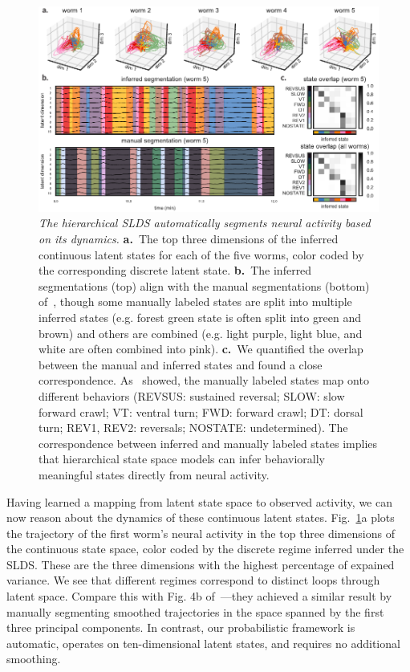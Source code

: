 \documentclass[11pt]{article}
\begin{document}
\begin{figure}[t!]
\centering
\includegraphics[width=6in]{figures/v3/figure4} 
\caption{ \textit{The hierarchical SLDS automatically segments neural
    activity based on its dynamics.}  \textbf{a.}~The top three
  dimensions of the inferred continuous latent states for each of the
  five worms, color coded by the corresponding discrete latent state.
  \textbf{b.}~The inferred segmentations (top) align with the manual
  segmentations (bottom) of~\citet{kato2015global}, though some
  manually labeled states are split into multiple inferred states
  (e.g. forest green state is often split into green and brown) and
  others are combined (e.g. light purple, light blue, and white are
  often combined into pink).  \textbf{c.}~We quantified the overlap
  between the manual and inferred states and found a close
  correspondence.  As~\citet{kato2015global} showed, the manually
  labeled states map onto different behaviors (\textsf{REVSUS}:
  sustained reversal; \textsf{SLOW}: slow forward crawl; \textsf{VT}:
  ventral turn; \textsf{FWD}: forward crawl; \textsf{DT}: dorsal turn;
  \textsf{REV1, REV2}: reversals; \textsf{NOSTATE}:
  undetermined). The correspondence between inferred and manually
  labeled states implies that hierarchical state space models can
  infer behaviorally meaningful states directly from neural activity.}
\label{fig:syllables}
\end{figure}

Having learned a mapping from latent state space to observed activity,
we can now reason about the dynamics of these continuous latent
states. Fig.~\ref{fig:syllables}a plots the trajectory of the first
worm's neural activity in the top three dimensions of the continuous
state space, color coded by the discrete regime inferred under the
SLDS.  These are the three dimensions with the highest percentage of
expained variance. We see that different regimes correspond to
distinct loops through latent space.  Compare this with Fig. 4b
of~\citet{kato2015global}---they achieved a similar result by manually
segmenting smoothed trajectories in the space spanned by the first
three principal components.  In contrast, our probabilistic framework
is automatic, operates on ten-dimensional latent states, and requires
no additional smoothing.
\end{document}
